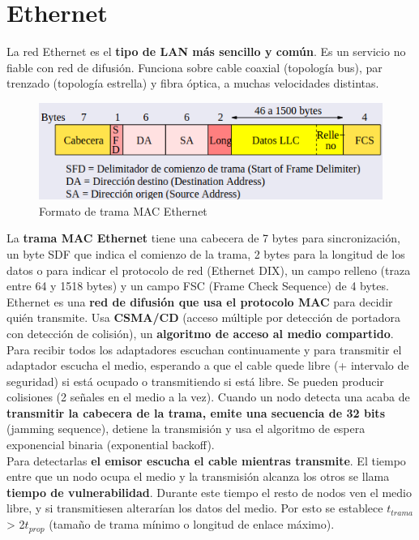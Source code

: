 \documentclass{article}
\begin{document}
\newpage

\section{Ethernet}

La red Ethernet es el \textbf{tipo de LAN más sencillo y común}. Es un servicio no fiable con red de difusión. Funciona sobre cable coaxial (topología bus), par trenzado (topología estrella) y fibra óptica, a muchas velocidades distintas. \\

\begin{figure}
    \centering
    \includegraphics[width=\linewidth]{img-t5/img_324_16.png}
    \caption{Formato de trama MAC Ethernet}
\end{figure}

La \textbf{trama MAC Ethernet} tiene una cabecera de 7 bytes para sincronización, un byte SDF que
indica el comienzo de la trama, 2 bytes para la longitud de los datos o para indicar el protocolo
de red (Ethernet DIX), un campo relleno (traza entre 64 y 1518 bytes) y un campo FSC (Frame
Check Sequence) de 4 bytes. \\


Ethernet es una \textbf{red de difusión que usa el protocolo MAC} para decidir quién transmite. Usa \textbf{CSMA/CD} (acceso múltiple por detección de portadora con detección de colisión), un \textbf{algoritmo de acceso al medio compartido}. Para recibir todos los adaptadores escuchan continuamente y para
transmitir el adaptador escucha el medio, esperando a que el cable quede libre (+ intervalo de seguridad) si está ocupado o transmitiendo si está libre. Se pueden producir colisiones (2 señales en el medio a la vez). Cuando un nodo detecta una acaba de \textbf{transmitir la cabecera de la trama, emite una secuencia de 32 bits} (jamming sequence), detiene la transmisión y usa el algoritmo de espera exponencial binaria (exponential backoff). \\ 

Para detectarlas \textbf{el emisor escucha el cable mientras transmite}. El tiempo entre que un nodo ocupa el medio y la transmisión alcanza los otros se llama \textbf{tiempo de vulnerabilidad}. Durante este tiempo el resto de nodos ven el medio libre, y si transmitiesen alterarían los datos del medio. Por esto se establece $t_{trama}$ > 2$t_{prop}$ (tamaño de trama mínimo o longitud de enlace máximo). \\
\end{document}
